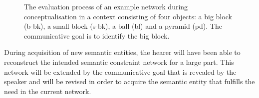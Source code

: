 \begin{figure}[htbp]
\centering
{}
\caption[Evaluation process of an example constraint
network]{ The evaluation process of an
  example network  during
  conceptualisation in a context consisting of four objects: a big
  block (b-bk), a small block (s-bk), a ball (bl) and a pyramid
  (pd). The communicative goal is to identify the big block.}
\label{f:evaluation}
\end{figure}

During acquisition of new semantic entities, the hearer will have been
able to reconstruct the intended semantic constraint network for a
large part. This network will be extended by the communicative goal
that is revealed by the speaker and will be revised in order to
acquire the semantic entity that fulfills the need in the current
network.

